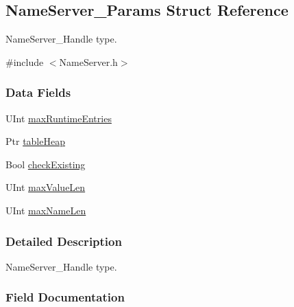 \subsection{Name\-Server\-\_\-\-Params Struct Reference}
\label{struct_name_server___params}


Name\-Server\-\_\-\-Handle type.  




{\ttfamily \#include $<$Name\-Server.\-h$>$}

\subsubsection*{Data Fields}
\begin{DoxyCompactItemize}
\item 
U\-Int \hyperlink{struct_name_server___params_a26ee68e20b559b4c238c1e5a8646191f}{max\-Runtime\-Entries}
\item 
Ptr \hyperlink{struct_name_server___params_ac9c03b5c29cfe0507d2015c08253f69d}{table\-Heap}
\item 
Bool \hyperlink{struct_name_server___params_ac1accae9db70ea330e40c8da8d311eab}{check\-Existing}
\item 
U\-Int \hyperlink{struct_name_server___params_afa31d4aaa38615278dd7d8b25603bf5d}{max\-Value\-Len}
\item 
U\-Int \hyperlink{struct_name_server___params_a8fcc951ae29abaa33f11360cc4fa6441}{max\-Name\-Len}
\end{DoxyCompactItemize}


\subsubsection{Detailed Description}
Name\-Server\-\_\-\-Handle type. 

\subsubsection{Field Documentation}
